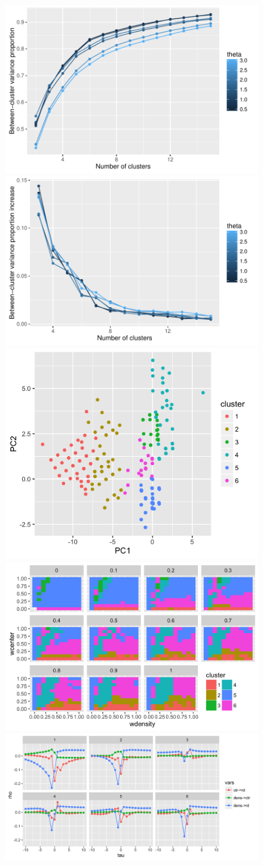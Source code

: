 \begin{figure}%
\centering
\includegraphics[width=0.49\linewidth]{Figures/CausalityRegimes/ccoef-knum_valuesFALSE_theta05-3.pdf}
\includegraphics[width=0.49\linewidth]{Figures/CausalityRegimes/dccoef-knum_valuesFALSEtheta05-3.pdf}\\
\includegraphics[width=0.4\linewidth]{Figures/CausalityRegimes/clusters-PCA-features_valuesFALSEtheta2_k6}
\includegraphics[width=0.59\linewidth]{Figures/CausalityRegimes/clusters-paramfacet_valuesFALSEtheta2_k6}\\
\includegraphics[width=\linewidth]{Figures/CausalityRegimes/clusters-centertrajs-facetclust_valuesFALSEtheta2_k6}

\end{figure}
